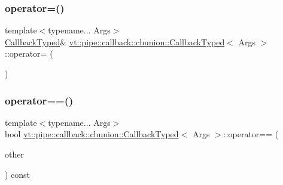 \mbox{\label{structvt_1_1pipe_1_1callback_1_1cbunion_1_1_callback_typed_a8a2b82218dbe268ee3ddef305654507b}} 
\subsubsection{\texorpdfstring{operator=()}{operator=()}}
{\footnotesize\ttfamily template$<$typename... Args$>$ \\
\hyperlink{structvt_1_1pipe_1_1callback_1_1cbunion_1_1_callback_typed}{Callback\+Typed}\& \hyperlink{structvt_1_1pipe_1_1callback_1_1cbunion_1_1_callback_typed}{vt\+::pipe\+::callback\+::cbunion\+::\+Callback\+Typed}$<$ Args $>$\+::operator= (\begin{DoxyParamCaption}\item[{\hyperlink{structvt_1_1pipe_1_1callback_1_1cbunion_1_1_callback_typed}{Callback\+Typed}$<$ Args $>$ const \&}]{ }\end{DoxyParamCaption})\hspace{0.3cm}{\ttfamily [default]}}

\mbox{\label{structvt_1_1pipe_1_1callback_1_1cbunion_1_1_callback_typed_a1256a1709839698421b422baa622f8c8}} 
\subsubsection{\texorpdfstring{operator==()}{operator==()}\hspace{0.1cm}{\footnotesize\ttfamily [1/2]}}
{\footnotesize\ttfamily template$<$typename... Args$>$ \\
bool \hyperlink{structvt_1_1pipe_1_1callback_1_1cbunion_1_1_callback_typed}{vt\+::pipe\+::callback\+::cbunion\+::\+Callback\+Typed}$<$ Args $>$\+::operator== (\begin{DoxyParamCaption}\item[{\hyperlink{structvt_1_1pipe_1_1callback_1_1cbunion_1_1_callback_typed}{Callback\+Typed}$<$ Args... $>$ const \&}]{other }\end{DoxyParamCaption}) const\hspace{0.3cm}{\ttfamily [inline]}}

